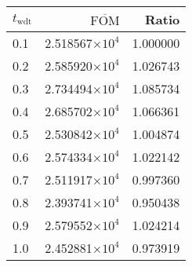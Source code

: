 \begin{tabular}{lrr}
\toprule
$t_{\mathrm{wdt}}$ & $\overline{\mathrm{FOM}}$ &    Ratio \\
\midrule
               0.1 &   2.518567$\times 10^{4}$ & 1.000000 \\
               0.2 &   2.585920$\times 10^{4}$ & 1.026743 \\
               0.3 &   2.734494$\times 10^{4}$ & 1.085734 \\
               0.4 &   2.685702$\times 10^{4}$ & 1.066361 \\
               0.5 &   2.530842$\times 10^{4}$ & 1.004874 \\
               0.6 &   2.574334$\times 10^{4}$ & 1.022142 \\
               0.7 &   2.511917$\times 10^{4}$ & 0.997360 \\
               0.8 &   2.393741$\times 10^{4}$ & 0.950438 \\
               0.9 &   2.579552$\times 10^{4}$ & 1.024214 \\
               1.0 &   2.452881$\times 10^{4}$ & 0.973919 \\
\bottomrule
\end{tabular}
